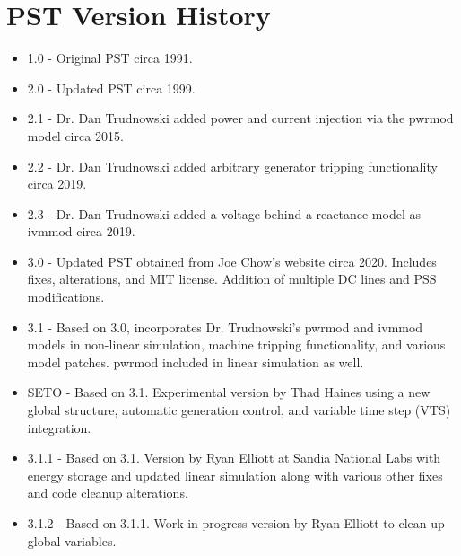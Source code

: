 \chapter{PST Version History}



\hspace{-4.2em}
\begin{minipage}{.666\linewidth}
\begin{itemize}
\raggedright
{} em
\singlespacing
\item 1.0 - Original PST circa 1991.
\item 2.0 - Updated PST circa 1999.
\item 2.1 - Dr. Dan Trudnowski added power and current injection via the pwrmod model circa 2015.
\item 2.2 - Dr. Dan Trudnowski added arbitrary generator tripping functionality circa 2019.
\item 2.3 - Dr. Dan Trudnowski added a voltage behind a reactance model as ivmmod circa 2019.
\item 3.0 - Updated PST obtained from Joe Chow's website circa 2020. 
Includes fixes, alterations, and MIT license.
Addition of multiple DC lines and PSS modifications.
\item 3.1 - Based on 3.0, incorporates Dr. Trudnowski's pwrmod and ivmmod models in non-linear simulation, machine tripping functionality, and various model patches.
pwrmod included in linear simulation as well. 
\item SETO - Based on 3.1. Experimental version by Thad Haines using a new global structure, automatic generation control, and variable time step (VTS) integration. 
\item 3.1.1 - Based on 3.1. Version by Ryan Elliott at Sandia National Labs with energy storage and updated linear simulation along with various other fixes and code cleanup alterations. 
\item 3.1.2 - Based on 3.1.1. Work in progress version by Ryan Elliott to clean up global variables.


\end{itemize}
\end{minipage}
